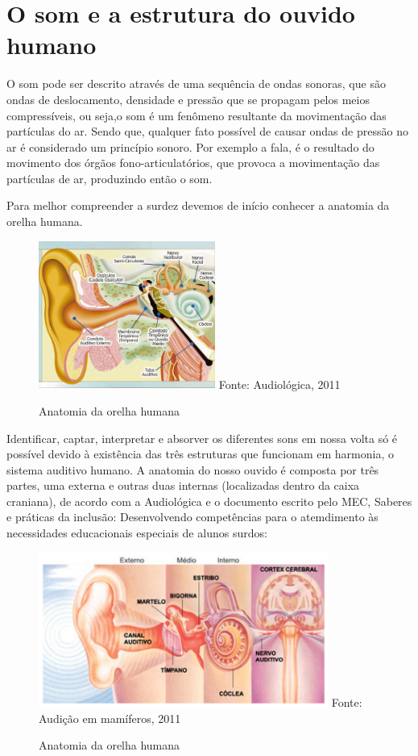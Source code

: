 \documentclass[brasil]{abnt}
\begin{document}
\chapter{O som e a estrutura do ouvido humano}
			O som pode ser descrito através de uma sequência de ondas sonoras, que são ondas de deslocamento, densidade e pressão que se propagam pelos meios compressíveis, ou seja,o som é um fenômeno resultante 
			da movimentação das partículas do ar. Sendo que, qualquer fato possível de causar ondas de pressão no ar é considerado um princípio sonoro.	Por exemplo a fala, é o resultado do movimento dos órgãos 
			fono-articulatórios, que provoca a movimentação das partículas de ar, produzindo então o som.
			
			Para melhor compreender a surdez devemos de início conhecer a anatomia da orelha humana.
				\begin{figure}[h]
					\caption{Anatomia da orelha humana}
					\center
					\includegraphics[width=58mm]{aa.png}
					\center Fonte: Audiológica, 2011
				\end{figure}
			
			Identificar, captar, interpretar e absorver os diferentes sons em nossa volta só é possível devido à existência das três estruturas que funcionam em harmonia, o sistema auditivo humano.
			A anatomia do nosso ouvido é composta por três partes, uma externa e outras duas internas (localizadas dentro da caixa craniana), de acordo com a Audiológica e o documento escrito pelo MEC, 
			Saberes e práticas da inclusão: Desenvolvendo competências para o atemdimento às necessidades educacionais especiais de alunos surdos:
			
				\begin{figure}[!htb]
					\caption{Anatomia da orelha humana}
					\center
					\includegraphics[width=95mm]{aa2.png}
					\center Fonte: Audição em mamíferos, 2011
				\end{figure}
				
\end{document}
